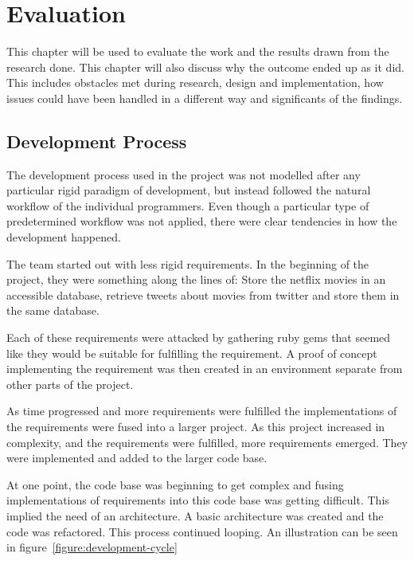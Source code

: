 
\chapter{Evaluation}

\minitoc

This chapter will be used to evaluate the work and the results drawn from the research done. This chapter will also discuss why the outcome ended up as it did. This includes obstacles met during research, design and implementation, how issues could have been handled in a different way and significants of the findings.

\clearpage


\section{Development Process}
The development process used in the project was not modelled after any particular rigid paradigm of development, but instead followed the natural workflow of the individual programmers. Even though a particular type of predetermined workflow was not applied, there were clear tendencies in how the development happened.

The team started out with less rigid requirements. In the beginning of the project, they were something along the lines of: Store the netflix movies in an accessible database, retrieve tweets about movies from twitter and store them in the same database.

Each of these requirements were attacked by gathering ruby gems that seemed like they would be suitable for fulfilling the requirement. A proof of concept implementing the requirement was then created in an environment separate from other parts of the project.

As time progressed and more requirements were fulfilled the implementations of the requirements were fused into a larger project. As this project increased in complexity, and the requirements were fulfilled, more requirements emerged. They were implemented and added to the larger code base.

At one point, the code base was beginning to get complex and fusing implementations of requirements into this code base was getting difficult. This implied the need of an architecture. A basic architecture was created and the code was refactored. This process continued looping. An illustration can be seen in figure~\ref{figure:development-cycle}


